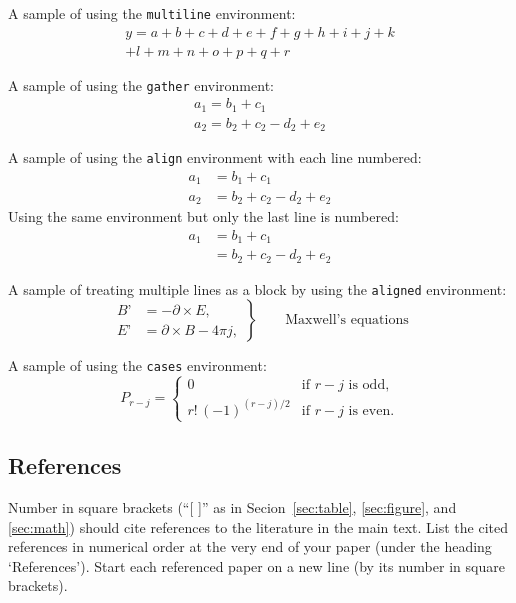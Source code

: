 \documentclass[conference]{worldcomp}
\begin{document}
A sample of using the \texttt{multiline} environment:
\begin{multline}
y = a+b+c+d+e+f+g+h+i+j+k\\
+l+m+n+o+p+q+r
\end{multline}

A sample of using the \texttt{gather} environment:
\begin{gather}
a_1=b_1+c_1\\
a_2=b_2+c_2-d_2+e_2
\end{gather}

A sample of using the \texttt{align} environment with each line numbered:
\begin{align}
a_1& =b_1+c_1\\
a_2& =b_2+c_2-d_2+e_2
\end{align}
Using the same environment but only the last line is numbered:
\begin{align}
a_1& =b_1+c_1 \nonumber\\
   & =b_2+c_2-d_2+e_2
\end{align}


A sample of treating multiple lines as a block by using the \texttt{aligned} environment:
\begin{equation}
\left.\begin{aligned}
  B’&=-\partial\times E,\\
  E’&=\partial\times B - 4\pi j,
\end{aligned}
\right\}
\qquad \text{Maxwell's equations}
\end{equation}

A sample of using the \texttt{cases} environment:
\begin{equation}
P_{r-j}=\begin{cases}
    0& \text{if $r-j$ is odd},\\
    r!\,(-1)^{(r-j)/2}& \text{if $r-j$ is even}.
  \end{cases}
\end{equation}




\subsection{References}
Number in square brackets (``[ ]'' as in Secion~\ref{sec:table}, \ref{sec:figure}, and \ref{sec:math}) should cite references to 
the literature in the main text. List the cited references in numerical order at 
the very end of your paper (under the heading `References'). Start each 
referenced paper on a new line (by its number in square brackets).
\end{document}
